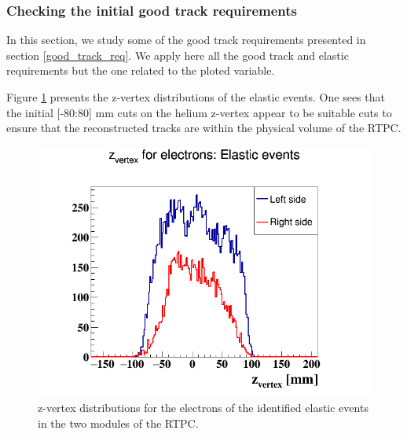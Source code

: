 \subsubsection{Checking the initial good track requirements}
In this section, we study some of the good track requirements 
presented in section \ref{good_track_req}. We apply here all the good track 
and elastic requirements but the one related to the ploted variable.

Figure \ref{fig:2-z-vertex} presents the z-vertex distributions of the elastic 
events. One 
sees that the initial [-80:80] mm cuts on the helium z-vertex appear to be 
suitable cuts to ensure that the reconstructed tracks are within the physical 
volume of the RTPC.
\begin{figure}[tp]
  \centering
   \includegraphics[scale=0.34]{fig_rtpc/updates/elastic_z_vertex.png}
\caption{z-vertex distributions for the electrons of the identified elastic 
events in the two modules of the RTPC.}
\label{fig:2-z-vertex}
\end{figure} 

